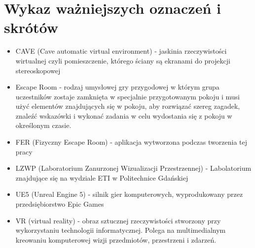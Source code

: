 \chapter*{Wykaz ważniejszych oznaczeń i skrótów}

\begin{itemize}
    \item CAVE (Cave automatic virtual environment) - jaskinia  rzeczywistości wirtualnej czyli pomieszczenie, którego ściany są ekranami do projekcji stereoskopowej

    \item Escape Room - rodzaj umysłowej gry przygodowej w którym grupa uczestników zostaje zamknięta w specjalnie          przygotowanym pokoju i musi użyć elementów znajdujących się w pokoju, aby rozwiązać szereg zagadek, znaleźć wskazówki i wykonać zadania w celu wydostania się z pokoju w określonym czasie.

    \item FER (Fizyczny Escape Room) - aplikacja wytworzona podczas tworzenia tej pracy 


    \item LZWP (Laboratorium Zanurzonej Wizualizacji Przestrzennej) - Labolatorium znajdujące się na wydziale ETI w Politechnice Gdańskiej

    \item UE5 (Unreal Engine 5) - silnik gier komputerowych, wyprodukowany przez przedsiębiorstwo Epic Games

    \item VR (virtual reality) - obraz sztucznej rzeczywistości stworzony przy wykorzystaniu technologii informatycznej. Polega na multimedialnym kreowaniu komputerowej wizji przedmiotów, przestrzeni i zdarzeń. 

\end{itemize}